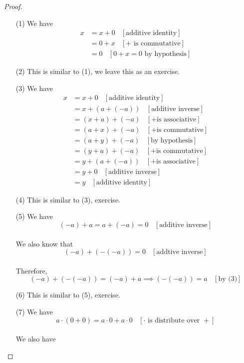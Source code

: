 \documentclass{book}
\begin{document}
\begin{proof}
    \begin{itemize}[itemsep = 0pt]
        \item[(1)] We have
        \begin{align*}
            x & = x + 0 \ \ \ \ [\text{additive identity}] \\
            & = 0 + x \ \ \ \ [+ \text{ is commutative}] \\
            & = 0 \ \ \ \ [0 + x = 0 \text{ by hypothesis}]
        \end{align*}
        \item[(2)] This is similar to (1), we leave this as an exercise.
        \item[(3)] We have
        \begin{align*}
            x & = x + 0 \ \ \ \ [\text{additive identity}] \\
            & = x + (a + (-a)) \ \ \ \ [\text{additive inverse}] \\
            & = (x + a) + (-a) \ \ \ \ [+ \text{is associative}] \\
            & = (a + x) + (-a) \ \ \ \ [+ \text{is commutative}] \\
            & = (a + y) + (-a) \ \ \ \ [\text{by hypothesis}] \\
            & = (y + a) + (-a) \ \ \ \ [+ \text{is commutative}] \\
            & = y + (a + (-a)) \ \ \ \ [+ \text{is associative}] \\
            & = y + 0 \ \ \ \ [\text{additive inverse}] \\
            & = y \ \ \ \ [\text{additive identity}]
        \end{align*}
        \item[(4)] This is similar to (3), exercise.
        \item[(5)] We have
        $$(-a) + a = a + (-a) = 0 \ \ \ \ [\text{additive inverse}]$$ \\
        We also know that
        $$(-a) + (-(-a)) = 0 \ \ \ \ [\text{addtive inverse}]$$ \\
        Therefore,
        $$(-a) + (-(-a)) = (-a) + a \implies (-(-a)) = a \ \ \ \ [\text{by (3)}]$$
        \item[(6)] This is similar to (5), exercise.
        \item[(7)] We have
        $$a \cdot (0 + 0) = a \cdot 0 + a \cdot 0 \ \ \ \ [\cdot \text{ is distribute over } +]$$ \\
        We also have

\end{itemize}
\end{proof}
\end{document}
